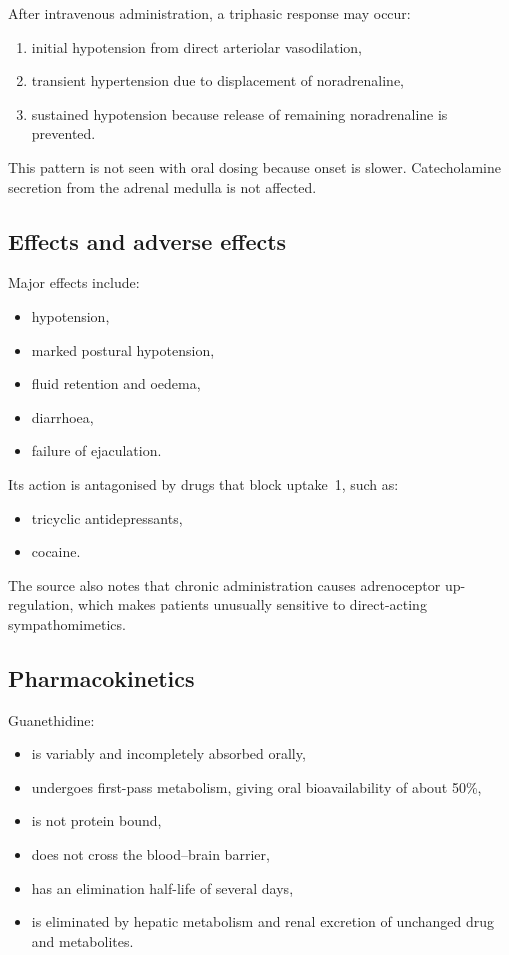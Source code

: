 \documentclass[11pt,a4paper]{article}
\begin{document}
After intravenous administration, a triphasic response may occur:
\begin{enumerate}
    \item initial hypotension from direct arteriolar vasodilation,
    \item transient hypertension due to displacement of noradrenaline,
    \item sustained hypotension because release of remaining noradrenaline is prevented.
\end{enumerate}

This pattern is not seen with oral dosing because onset is slower. Catecholamine secretion from the adrenal medulla is not affected.

\subsection{Effects and adverse effects}

Major effects include:
\begin{itemize}
    \item hypotension,
    \item marked postural hypotension,
    \item fluid retention and oedema,
    \item diarrhoea,
    \item failure of ejaculation.
\end{itemize}

Its action is antagonised by drugs that block uptake~1, such as:
\begin{itemize}
    \item tricyclic antidepressants,
    \item cocaine.
\end{itemize}

The source also notes that chronic administration causes adrenoceptor up-regulation, which makes patients unusually sensitive to direct-acting sympathomimetics.

\subsection{Pharmacokinetics}

Guanethidine:
\begin{itemize}
    \item is variably and incompletely absorbed orally,
    \item undergoes first-pass metabolism, giving oral bioavailability of about 50\%,
    \item is not protein bound,
    \item does not cross the blood--brain barrier,
    \item has an elimination half-life of several days,
    \item is eliminated by hepatic metabolism and renal excretion of unchanged drug and metabolites.
\end{itemize}
\end{document}
